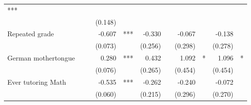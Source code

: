 \documentclass{article}
\begin{document}
\begin{table}[!h]
\begin{tabular}{lllllllllll}
  \multicolumn{1}{l}{***} &
  \multicolumn{1}{r}{} &
  \multicolumn{1}{l}{} &
  \multicolumn{1}{r}{} &
  \multicolumn{1}{l}{} &
  \multicolumn{1}{r}{} &
  \multicolumn{1}{l}{} \\
\multicolumn{1}{l}{} &
  \multicolumn{1}{r}{} &
  \multicolumn{1}{l}{} &
  \multicolumn{1}{r}{(0.148)} &
  \multicolumn{1}{l}{} &
  \multicolumn{1}{r}{} &
  \multicolumn{1}{l}{} &
  \multicolumn{1}{r}{} &
  \multicolumn{1}{l}{} &
  \multicolumn{1}{r}{} &
  \multicolumn{1}{l}{} \\
\multicolumn{1}{l}{Repeated grade} &
  \multicolumn{1}{r}{} &
  \multicolumn{1}{l}{} &
  \multicolumn{1}{r}{-0.607} &
  \multicolumn{1}{l}{***} &
  \multicolumn{1}{r}{-0.330} &
  \multicolumn{1}{l}{} &
  \multicolumn{1}{r}{-0.067} &
  \multicolumn{1}{l}{} &
  \multicolumn{1}{r}{-0.138} &
  \multicolumn{1}{l}{} \\
\multicolumn{1}{l}{} &
  \multicolumn{1}{r}{} &
  \multicolumn{1}{l}{} &
  \multicolumn{1}{r}{(0.073)} &
  \multicolumn{1}{l}{} &
  \multicolumn{1}{r}{(0.256)} &
  \multicolumn{1}{l}{} &
  \multicolumn{1}{r}{(0.298)} &
  \multicolumn{1}{l}{} &
  \multicolumn{1}{r}{(0.278)} &
  \multicolumn{1}{l}{} \\
\multicolumn{1}{l}{German mothertongue} &
  \multicolumn{1}{r}{} &
  \multicolumn{1}{l}{} &
  \multicolumn{1}{r}{0.280} &
  \multicolumn{1}{l}{***} &
  \multicolumn{1}{r}{0.432} &
  \multicolumn{1}{l}{} &
  \multicolumn{1}{r}{1.092} &
  \multicolumn{1}{l}{*} &
  \multicolumn{1}{r}{1.096} &
  \multicolumn{1}{l}{*} \\
\multicolumn{1}{l}{} &
  \multicolumn{1}{r}{} &
  \multicolumn{1}{l}{} &
  \multicolumn{1}{r}{(0.076)} &
  \multicolumn{1}{l}{} &
  \multicolumn{1}{r}{(0.265)} &
  \multicolumn{1}{l}{} &
  \multicolumn{1}{r}{(0.454)} &
  \multicolumn{1}{l}{} &
  \multicolumn{1}{r}{(0.454)} &
  \multicolumn{1}{l}{} \\
\multicolumn{1}{l}{Ever tutoring Math} &
  \multicolumn{1}{r}{} &
  \multicolumn{1}{l}{} &
  \multicolumn{1}{r}{-0.535} &
  \multicolumn{1}{l}{***} &
  \multicolumn{1}{r}{-0.262} &
  \multicolumn{1}{l}{} &
  \multicolumn{1}{r}{-0.240} &
  \multicolumn{1}{l}{} &
  \multicolumn{1}{r}{-0.072} &
  \multicolumn{1}{l}{} \\
\multicolumn{1}{l}{} &
  \multicolumn{1}{r}{} &
  \multicolumn{1}{l}{} &
  \multicolumn{1}{r}{(0.060)} &
  \multicolumn{1}{l}{} &
  \multicolumn{1}{r}{(0.215)} &
  \multicolumn{1}{l}{} &
  \multicolumn{1}{r}{(0.296)} &
  \multicolumn{1}{l}{} &
  \multicolumn{1}{r}{(0.270)} &
  \multicolumn{1}{l}{} \\

\end{tabular}
\end{table}
\end{document}
